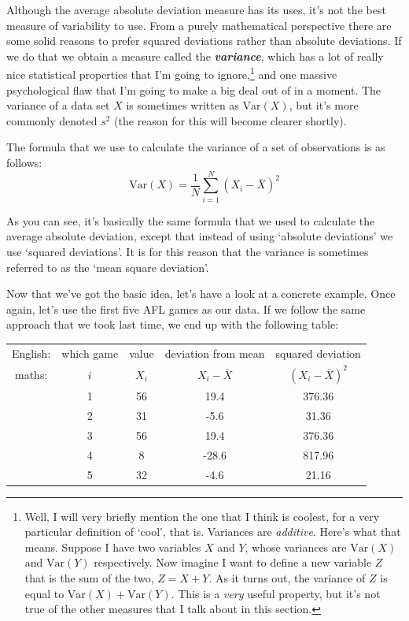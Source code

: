 \documentclass[
]{book}
\begin{document}
Although the average absolute deviation measure has its uses, it's not the best measure of variability to use. From a purely mathematical perspective there are some solid reasons to prefer squared deviations rather than absolute deviations. If we do that we obtain a measure called the \textbf{\emph{variance}}, which has a lot of really nice statistical properties that I'm going to ignore,\footnote{Well, I will very briefly mention the one that I think is coolest, for a very particular definition of `cool', that is. Variances are \emph{additive}. Here's what that means. Suppose I have two variables \(X\) and \(Y\), whose variances are \(\mbox{Var}(X)\) and \(\mbox{Var}(Y)\) respectively. Now imagine I want to define a new variable \(Z\) that is the sum of the two, \(Z = X+Y\). As it turns out, the variance of \(Z\) is equal to \(\mbox{Var}(X) + \mbox{Var}(Y)\). This is a \emph{very} useful property, but it's not true of the other measures that I talk about in this section.} and one massive psychological flaw that I'm going to make a big deal out of in a moment. The variance of a data set \(X\) is sometimes written as \(\mbox{Var}(X)\), but it's more commonly denoted \(s^2\) (the reason for this will become clearer shortly).

The formula that we use to calculate the variance of a set of observations is as follows:
\[
\mbox{Var}(X) = \frac{1}{N} \sum_{i=1}^N \left( X_i - \bar{X} \right)^2
\]

As you can see, it's basically the same formula that we used to calculate the average absolute deviation, except that instead of using `absolute deviations' we use `squared deviations'. It is for this reason that the variance is sometimes referred to as the `mean square deviation'.

Now that we've got the basic idea, let's have a look at a concrete example. Once again, let's use the first five AFL games as our data. If we follow the same approach that we took last time, we end up with the following table:

\vspace{0.5cm}
\begin{center}
\begin{tabular}{ccccc} 
English: & which game & value & deviation from mean & squared deviation \\
maths: & $i$ & $X_i$ & $X_i - \bar{X}$ &  $(X_i - \bar{X})^2$ \\ \hline
& 1 & 56 & 19.4  & 376.36\\
& 2 & 31 &  -5.6 & 31.36\\ 
& 3 & 56 & 19.4  & 376.36\\
& 4 & 8 & -28.6  & 817.96\\
& 5 & 32 & -4.6  & 21.16 \\
\end{tabular}
\end{center}
\end{document}
